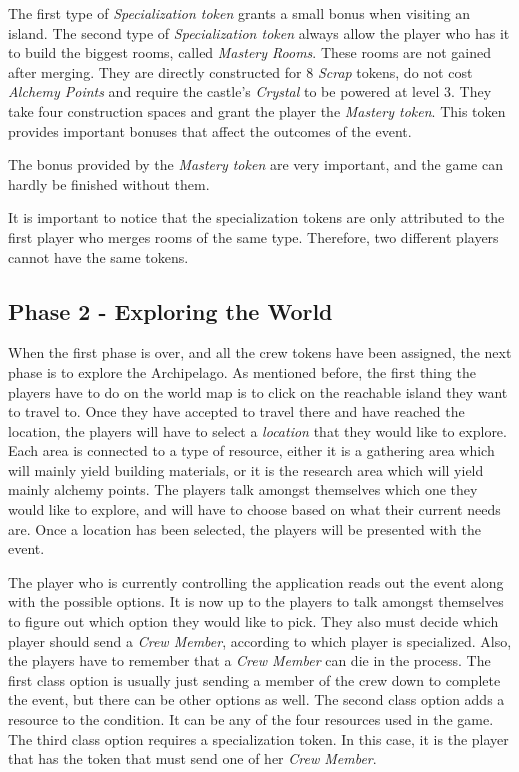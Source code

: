The first type of \textit{Specialization token} grants a small bonus when visiting an island. The second type of \textit{Specialization token} always allow the player who has it to build the biggest rooms, called \textit{Mastery Rooms}. These rooms are not gained after merging. They are directly constructed for 8 \textit{Scrap} tokens, do not cost \textit{Alchemy Points} and require the castle's \textit{Crystal} to be powered at level 3. They take four construction spaces and grant the player the \textit{Mastery token}. This token provides important bonuses that affect the outcomes of the event.

The bonus provided by the \textit{Mastery token} are very important, and the game can hardly be finished without them.

It is important to notice that the specialization tokens are only attributed to the first player who merges rooms of the same type. Therefore, two different players cannot have the same tokens.
\subsection{Phase 2 - Exploring the World}
\label{sec:p2}
When the first phase is over, and all the crew tokens have been assigned, the next phase is to explore the Archipelago.
As mentioned before, the first thing the players have to do on the world map is to click on the reachable island they want to travel to. Once they have accepted to travel there and have reached the location, the players will have to select a \textit{location} that they would like to explore.
Each area is connected to a type of resource, either it is a gathering area which will mainly yield building materials, or it is the research area which will yield mainly alchemy points. The players talk amongst themselves which one they would like to explore, and will have to choose based on what their current needs are. Once a location has been selected, the players will be presented with the event.

The player who is currently controlling the application reads out the event along with the possible options. It is now up to the players to talk amongst themselves to figure out which option they would like to pick. They also must decide which player should send a \textit{Crew Member}, according to which player is specialized. Also, the players have to remember that a \textit{Crew Member} can die in the process. The first class option is usually just sending a member of the crew down to complete the event, but there can be other options as well. The second class option adds a resource to the condition. It can be any of the four resources used in the game. The third class option requires a specialization token. In this case, it is the player that has the token that must send one of her \textit{Crew Member}. 

